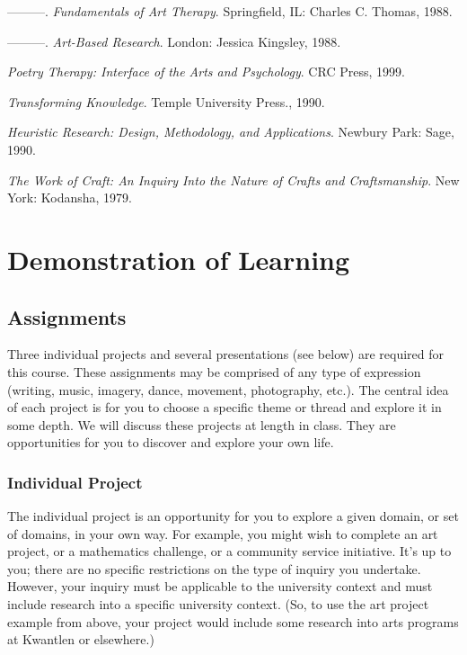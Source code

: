 \documentclass[letterpaper,10pt,headsepline]{scrreprt}
\begin{document}
\begin{description}
\item ---------. \textit{Fundamentals of Art Therapy}. Springfield, IL: Charles C. Thomas, 1988.
\item ---------. \textit{Art-Based Research}. London: Jessica Kingsley, 1988.
\item [Mazza, Nick] \textit{Poetry Therapy: Interface of the Arts and Psychology}. CRC Press, 1999.
\item [Minnich, E. K.] \textit{Transforming Knowledge}. Temple University Press., 1990.
\item [Moustakas, C.] \textit{Heuristic Research: Design, Methodology, and Applications}. Newbury Park: Sage, 1990.
\item [Needleman, Carla] \textit{The Work of Craft: An Inquiry Into the Nature of Crafts and Craftsmanship}. New York: Kodansha, 1979.

\end{description}

\clearpage

\section{Demonstration of Learning}

\subsection{Assignments}
Three individual projects and several presentations (see below) are required for this course. These assignments may be comprised of any type of expression (writing, music, imagery, dance, movement, photography, etc.). The central idea of each project is for you to choose a specific theme or thread and explore it in some depth. We will discuss these projects at length in class. They are opportunities for you to discover and explore your own life.


\subsubsection{Individual Project}

The individual project is an opportunity for you to explore a given domain, or set of domains, in your own way. For example, you might wish to complete an art project, or a mathematics challenge, or a community service initiative. It's up to you; there are no specific restrictions on the type of inquiry you undertake. However, your inquiry must be applicable to the university context and must include research into a specific university context. (So, to use the art project example from above, your project would include some research into arts programs at Kwantlen or elsewhere.)
\end{document}
